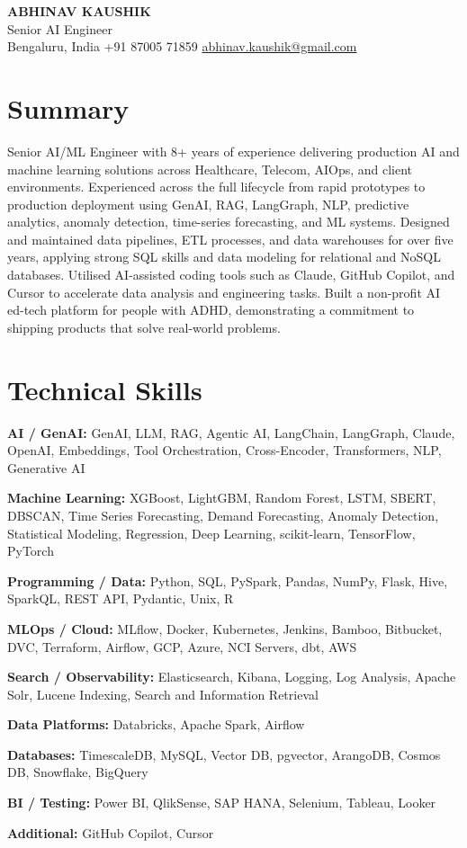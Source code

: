 \documentclass[10pt,a4paper]{article}
\begin{document}
\begin{center}
  {\LARGE\bfseries ABHINAV KAUSHIK}\\[2pt]
  {\large Senior AI Engineer}\\[2pt]
  Bengaluru, India \textbar{} +91 87005 71859 \textbar{} \href{mailto:abhinav.kaushik@gmail.com}{abhinav.kaushik@gmail.com}
\end{center}

\section{Summary}
Senior AI/ML Engineer with 8+ years of experience delivering production AI and machine learning solutions across Healthcare, Telecom, AIOps, and client environments. Experienced across the full lifecycle from rapid prototypes to production deployment using GenAI, RAG, LangGraph, NLP, predictive analytics, anomaly detection, time-series forecasting, and ML systems. Designed and maintained data pipelines, ETL processes, and data warehouses for over five years, applying strong SQL skills and data modeling for relational and NoSQL databases. Utilised AI-assisted coding tools such as Claude, GitHub Copilot, and Cursor to accelerate data analysis and engineering tasks. Built a non-profit AI ed-tech platform for people with ADHD, demonstrating a commitment to shipping products that solve real-world problems.

\section{Technical Skills}
\textbf{AI / GenAI:} GenAI, LLM, RAG, Agentic AI, LangChain, LangGraph, Claude, OpenAI, Embeddings, Tool Orchestration, Cross-Encoder, Transformers, NLP, Generative AI\par
\textbf{Machine Learning:} XGBoost, LightGBM, Random Forest, LSTM, SBERT, DBSCAN, Time Series Forecasting, Demand Forecasting, Anomaly Detection, Statistical Modeling, Regression, Deep Learning, scikit-learn, TensorFlow, PyTorch\par
\textbf{Programming / Data:} Python, SQL, PySpark, Pandas, NumPy, Flask, Hive, SparkQL, REST API, Pydantic, Unix, R\par
\textbf{MLOps / Cloud:} MLflow, Docker, Kubernetes, Jenkins, Bamboo, Bitbucket, DVC, Terraform, Airflow, GCP, Azure, NCI Servers, dbt, AWS\par
\textbf{Search / Observability:} Elasticsearch, Kibana, Logging, Log Analysis, Apache Solr, Lucene Indexing, Search and Information Retrieval\par
\textbf{Data Platforms:} Databricks, Apache Spark, Airflow\par
\textbf{Databases:} TimescaleDB, MySQL, Vector DB, pgvector, ArangoDB, Cosmos DB, Snowflake, BigQuery\par
\textbf{BI / Testing:} Power BI, QlikSense, SAP HANA, Selenium, Tableau, Looker\par
\textbf{Additional:} GitHub Copilot, Cursor\par
\end{document}
